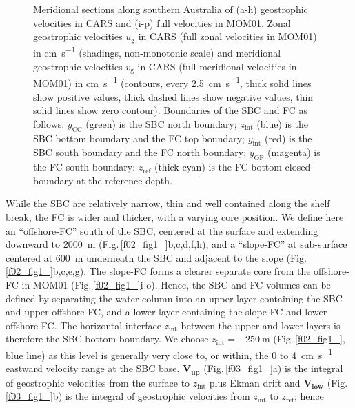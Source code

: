 \documentclass[preprint,3p,review,12pt]{elsarticle}
\renewcommand{\Vec}[1]{\mathbf{#1}}
\newcommand{\sub}[1]{_{\text{#1}}}
\begin{document}
\begin{figure}[p]
{  Meridional sections along southern Australia of (a-h) geostrophic velocities in CARS and (i-p) full velocities in MOM01. Zonal geostrophic velocities $u\sub{g}$ in CARS (full zonal velocities in MOM01) in \si{\centi\meter\per\second} (shadings, non-monotonic scale) and meridional geostrophic velocities $v\sub{g}$ in CARS (full meridional velocities in MOM01) in \si{\centi\meter\per\second} (contours, every \SI{2.5}{\centi\meter\per\second}, thick solid lines show positive values, thick dashed lines show negative values, thin solid lines show zero contour). Boundaries of the SBC and FC as follows: $y\sub{CC}$ (green) is the SBC north boundary; $z\sub{int}$ (blue) is the SBC bottom boundary and the FC top boundary; $y\sub{int}$ (red) is the SBC south boundary and the FC north boundary; $y\sub{OF}$ (magenta) is the FC south boundary; $z\sub{ref}$ (thick cyan) is the FC bottom closed boundary at the reference depth.}
\end{figure}

While the SBC are relatively narrow, thin and well contained along the shelf break, the FC is wider and thicker, with a varying core position. We define here an \enquote{offshore-FC}
south of the SBC, centered at the surface and extending downward to \SI{2000}{\meter} (Fig.\,\ref{f02_fig1_}b,c,d,f,h), and
a \enquote{slope-FC} at sub-surface centered at \SI{600}{\meter} underneath the SBC and adjacent to the slope (Fig.\,\ref{f02_fig1_}b,c,e,g). The slope-FC forms a clearer separate core from the offshore-FC in MOM01 (Fig.\,\ref{f02_fig1_}i-o).
Hence, the SBC and FC volumes can be defined by separating the water column into an upper layer containing the SBC and upper offshore-FC, and a lower layer containing the slope-FC and lower offshore-FC\@. The horizontal interface $z\sub{int}$ between the upper and lower layers is therefore the SBC bottom boundary. We choose $z\sub{int} = \SI{-250}{\meter}$ (Fig.\,\ref{f02_fig1_}, blue line) as this level is generally very close to, or within, the \num{0} to \SI{4}{\centi\meter\per\second} eastward velocity range at the SBC base. $\Vec{V\sub{up}}$ (Fig.\,\ref{f03_fig1_}a) is the integral of geostrophic velocities from the surface to $z\sub{int}$ plus Ekman drift and $\Vec{V\sub{low}}$ (Fig.\,\ref{f03_fig1_}b) is the integral of geostrophic velocities from $z\sub{int}$ to $z\sub{ref}$; hence
\end{document}
